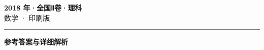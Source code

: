 \documentclass[zihao=5, a4paper]{ctexart}
\begin{document}
\begin{center}
  {\Large\bfseries 2018 年·全国Ⅱ卷·理科}\\[4pt]
  {\large 数学 · 印刷版}
\end{center}
\medskip
{}

\par\bigskip\hrule\bigskip
{}
\begin{center}{\large\bfseries 参考答案与详细解析}\end{center}
\smallskip

\end{document}
